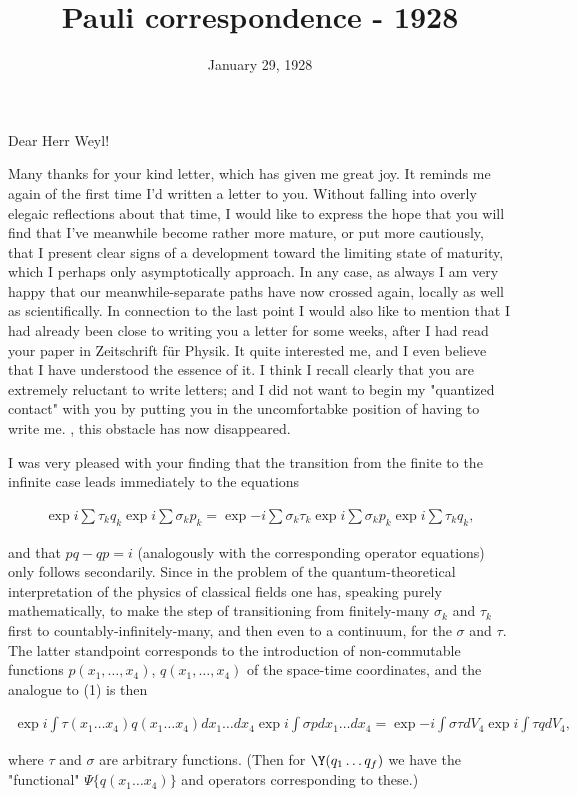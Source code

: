 \documentclass{article}
\title{Pauli correspondence - 1928}
\newcommand{\nc}[2]{
  \newcommand{#1}{#2}
}
\newcommand{\nequ}[2]{
\begin{align*}
#1
\tag{#2}
\end{align*}
}
\begin{document}
\date{January 29, 1928}

\nc{\D}{\mathcal{D}}

Dear Herr Weyl!

Many thanks for your kind letter, which has given me great joy. It reminds me again of the first time I'd written a letter to you. Without falling into overly elegaic reflections about that time, I would like to express the hope that you will find that I've meanwhile become rather more mature, or put more cautiously, that I present clear signs of a development toward the limiting state of maturity, which I perhaps only asymptotically approach. In any case, as always I am very happy that our meanwhile-separate paths have now crossed again, locally as well as scientifically. In connection to the last point I would also like to mention that I had already been close to writing you a letter for some weeks, after I had read your paper in Zeitschrift f\"ur Physik. It quite interested me, and I even believe that I have understood the essence of it. I think I recall clearly that you are extremely reluctant to write letters; and I did not want to begin my "quantized contact" with you by putting you in the uncomfortabke position of having to write me. , this obstacle has now disappeared.

I was very pleased with your finding that the transition from the finite to the infinite case leads immediately to the equations
\nequ{
\exp{i\sum\tau_k q_k} \exp{i\sum\sigma_k p_k} = 
\exp{-i\sum \sigma_k \tau_k} \exp{i\sum\sigma_k p_k} \exp{i\sum\tau_k q_k},
}{1}
and that $pq-qp=i$ (analogously with the corresponding operator equations) only follows secondarily. Since in the problem of the quantum-theoretical interpretation of the physics of classical fields one has, speaking purely mathematically, to make the step of transitioning from finitely-many $\sigma_k$ and $\tau_k$ first to countably-infinitely-many, and then even to a continuum, for the $\sigma$ and $\tau$. The latter standpoint corresponds to the introduction of non-commutable functions $p(x_1,\dots,x_4)$, $q(x_1,\dots,x_4)$ of the space-time coordinates, and the analogue to (1) is then
\nequ{
\exp{i\int\tau(x_1 \dots x_4)q(x_1 \dots x_4) dx_1\dots dx_4}
\exp{i\int\sigma p dx_1\dots dx_4} = 
\exp{-i\int\sigma\tau dV_4} \exp{i\int\tau q dV_4},
}{2}
where $\tau$ and $\sigma$ are arbitrary functions. (Then for $\Y(q_1\dots q_f)$ we have the "functional" $\Psi\{q(x_1\dots x_4)\}$ and operators corresponding to these.)
\end{document}
